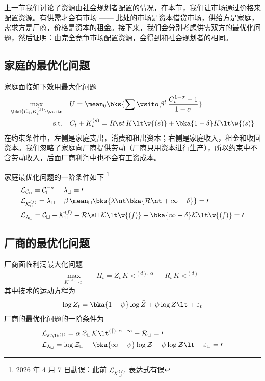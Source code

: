 上一节我们讨论了资源由社会规划者配置的情况，在本节，我们让市场通过价格来配置资源。有供需才会有市场 —— 此处的市场是资本借贷市场，供给方是家庭，需求方是厂商，价格是资本的租金。接下来，我们会分别考虑供需双方的最优化问题，然后证明：由完全竞争市场配置资源，会得到和社会规划者的相同。

\subsection{家庭的最优化问题}\label{subsec:HHProb}

家庭面临如下效用最大化问题
\begin{align*}
    \max_{\bkd{C_t,K^{(s)}_t}\wsito} \quad & U= \mean_0\bks{\sum\wsito \,\beta^t\,\dfrac{C_t^{1-\sigma}-1}{1-\sigma}} \\
    \text{s.t.} \quad & C_t+K_t^{(s)}=R\s t\,K\lt\w{(s)}+\bka{1-\delta}K\lt\w{(s)}
\end{align*}
在约束条件中，左侧是家庭支出，消费和租出资本；右侧是家庭收入，租金和收回资本。我们忽略了家庭向厂商提供劳动（厂商只用资本进行生产），所以约束中不含劳动收入，后面厂商利润中也不会有工资成本。

家庭最优化问题的一阶条件如下 \footnote{2026 年 4 月 7 日勘误：此前 \(\cal L_{K_t^{(s)}}\) 表达式有误}
\begin{align*}
    &\cal L_{C_t}=C^{-\sigma}_t-\lambda_t=0\\
    &\cal L_{K_t^{(s)}}=\lambda_t-\beta\,\mean_t\bks{\lambda\nt\bka{R\nt+1-\delta}}=0\\
    &\cal L_{\lambda_t}=C_t+K_t^{(s)}-R\s t\,K\lt\w{(s)}-\bka{1-\delta}K\lt\w{(s)}=0
\end{align*}


\subsection{厂商的最优化问题}\label{subsec:ProduceProb}

厂商面临利润最大化问题
\begin{align*}
    \max_{K^{(d)}\lt} \quad & \Pi_t=Z_t\,K\lt^{(d),\,\alpha}-R_t\, K\lt^{(d)}
\end{align*}
其中技术的运动方程为
\begin{align*}
    \log Z_t=\bka{1-\psi}\log\bar Z+\psi\log Z\lt+\varepsilon_t
\end{align*}
厂商的最优化问题的一阶条件为
\begin{align*}
    &\cal L_{K\lt^{(d)}}=\alpha\, Z_t\,K\lt^{(d),\,\alpha-1}-R_t=0\\
    &\cal L_{\lambda_t}=\log Z_t-\bka{1-\psi}\log\bar Z-\psi\log Z\lt-\varepsilon_t=0
\end{align*}

